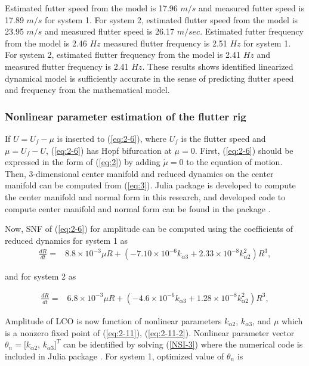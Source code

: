 \documentclass[openacc]{rsproca_new}%
\newcommand{\Eref}[1]{(\ref{#1})}
\begin{document}
Estimated futter speed from the model is 17.96 $m/s$ and measured futter speed is 17.89 $m/s$ for system 1. For system 2, estimated flutter speed from the model is 23.95 $m/s$ and measured flutter speed is 26.17 $m/sec$. Estimated futter frequency from the model is 2.46 $Hz$ measured flutter frequency is 2.51 $Hz$ for system 1. For system 2, estimated flutter frequency from the model is 2.41 $Hz$ and measured flutter frequency is 2.41 $Hz$. These results shows identified linearized dynamical model is sufficiently accurate in the sense of predicting flutter speed and frequency from the mathematical model.

\subsubsection{Nonlinear parameter estimation of the flutter rig}\label{nonlinear}

If $U=U_f-\mu$ is inserted to \Eref{eq:2-6}, where $U_f$ is the flutter speed and $\mu=U_f-U$, \Eref{eq:2-6} has Hopf bifurcation at $\mu=0$. First, \Eref{eq:2-6} should be expressed in the form of \Eref{eq:2} by adding $\dot \mu=0$ to the equation of motion. Then, 3-dimensional center manifold and reduced dynamics on the center manifold can be computed from \Eref{eq:3}. Julia \cite{bezanson2017julia} package is developed to compute the center manifold and normal form in this research, and developed code to compute center manifold and normal form can be found in the package \cite{hopfNF}.

Now, SNF of \Eref{eq:2-6} for amplitude can be computed using the coefficients of reduced dynamics for system 1 as
\begin{align}\label{eq:2-11}
\frac{dR}{dt}=&8.8\times 10^{-3}\mu R+(- 7.10 \times 10^{-6}  k_{\alpha 3} + 2.33 \times 10^{-8} k_{\alpha 2}^2)R^3,
\end{align}

\noindent and for system 2 as

\begin{align}\label{eq:2-11-2}
\frac{dR}{dt}=&6.8\times 10^{-3}\mu R+(- 4.6 \times 10^{-6}  k_{\alpha 3} + 1.28 \times 10^{-8} k_{\alpha 2}^2)R^3,
\end{align}

\noindent Amplitude of LCO is now function of nonlinear parameters $k_{\alpha2}$, $k_{\alpha3}$, and $\mu$ which is a nonzero fixed point of \Eref{eq:2-11}, \Eref{eq:2-11-2}. Nonlinear parameter vector $\theta_n=[k_{\alpha2}$, $k_{\alpha3}]^T$ can be identified by solving \Eref{NSI-3} where the numerical code is included in Julia package \cite{hopfNF}. For system 1, optimized value of $\theta_n$ is
\end{document}
